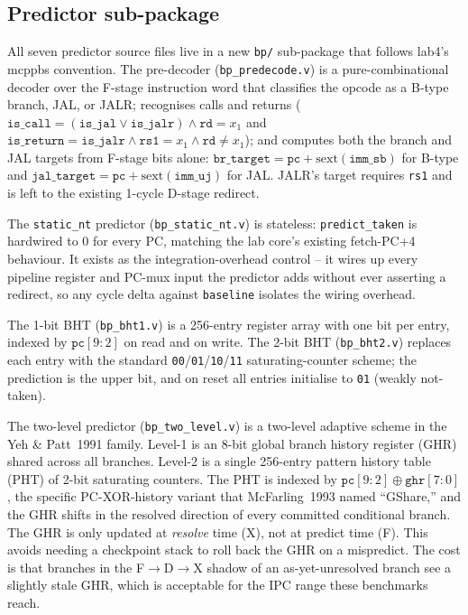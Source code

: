 \documentclass[10pt]{article}
\begin{document}
\subsection{Predictor sub-package}

All seven predictor source files live in a new \texttt{bp/}
sub-package that follows lab4's mcppbs convention. The pre-decoder
(\texttt{bp\_predecode.v}) is a pure-combinational decoder over the
F-stage instruction word that classifies the opcode as a B-type
branch, JAL, or JALR; recognises calls and returns
($\texttt{is\_call}=(\texttt{is\_jal}\lor\texttt{is\_jalr})\land
\texttt{rd}{=}x_1$ and
$\texttt{is\_return}=\texttt{is\_jalr}\land\texttt{rs1}{=}x_1\land
\texttt{rd}{\neq}x_1$); and computes both the branch and JAL targets
from F-stage bits alone:
$\texttt{br\_target}=\texttt{pc}+\text{sext}(\texttt{imm\_sb})$ for
B-type and $\texttt{jal\_target}=\texttt{pc}+\text{sext}(\texttt{imm\_uj})$
for JAL. JALR's target requires \texttt{rs1} and is left to the
existing 1-cycle D-stage redirect.

The \texttt{static\_nt} predictor (\texttt{bp\_static\_nt.v}) is
stateless: \texttt{predict\_taken} is hardwired to 0 for every PC,
matching the lab core's existing fetch-PC+4 behaviour. It exists as
the integration-overhead control -- it wires up every pipeline
register and PC-mux input the predictor adds without ever asserting
a redirect, so any cycle delta against \texttt{baseline} isolates
the wiring overhead.

The 1-bit BHT (\texttt{bp\_bht1.v}) is a 256-entry register array
with one bit per entry, indexed by $\texttt{pc}[9{:}2]$ on read and on
write. The 2-bit BHT (\texttt{bp\_bht2.v}) replaces each entry with
the standard \texttt{00}/\texttt{01}/\texttt{10}/\texttt{11}
saturating-counter scheme; the prediction is the upper bit, and on
reset all entries initialise to \texttt{01} (weakly not-taken).

The two-level predictor (\texttt{bp\_two\_level.v}) is a two-level
adaptive scheme in the Yeh \& Patt~1991 family. Level-1 is an 8-bit
global branch history register (GHR) shared across all branches.
Level-2 is a single 256-entry pattern history table (PHT) of 2-bit
saturating counters. The PHT is indexed by
$\texttt{pc}[9{:}2] \oplus \texttt{ghr}[7{:}0]$, the specific
PC-XOR-history variant that McFarling~1993 named ``GShare,'' and the
GHR shifts in the resolved direction of every committed conditional
branch. The GHR is only updated at \emph{resolve} time (X), not at
predict time (F). This avoids needing a checkpoint stack to roll
back the GHR on a mispredict. The cost is that branches in the
F$\rightarrow$D$\rightarrow$X shadow of an as-yet-unresolved branch
see a slightly stale GHR, which is acceptable for the IPC range these
benchmarks reach.
\end{document}
